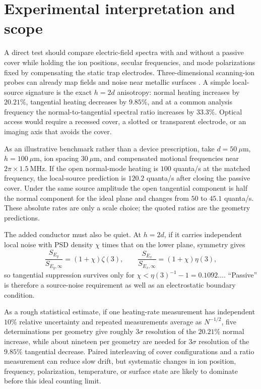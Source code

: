 \documentclass[aps,pra,twocolumn,superscriptaddress,longbibliography,nofootinbib,floatfix]{revtex4-2}
\theoremstyle{remark}
\begin{document}
\section{Experimental interpretation and scope}
\label{sec:experiment}

A direct test should compare electric-field spectra with and without a passive cover while holding the ion positions, secular frequencies, and mode polarizations fixed by compensating the static trap electrodes.  Three-dimensional scanning-ion probes can already map fields and noise near metallic surfaces \cite{Sagesser2024}.  A simple local-source signature is the exact $h=2d$ anisotropy: normal heating increases by $20.21\%$, tangential heating decreases by $9.85\%$, and at a common analysis frequency the normal-to-tangential spectral ratio increases by $33.3\%$.  Optical access would require a recessed cover, a slotted or transparent electrode, or an imaging axis that avoids the cover.

As an illustrative benchmark rather than a device prescription, take $d=50~\mu\mathrm m$, $h=100~\mu\mathrm m$, ion spacing $30~\mu\mathrm m$, and compensated motional frequencies near $2\pi\times1.5~\mathrm{MHz}$.  If the open normal-mode heating is $100$ quanta/s at the matched frequency, the local-source prediction is $120.2$ quanta/s after closing the passive cover.  Under the same source amplitude the open tangential component is half the normal component for the ideal plane and changes from $50$ to $45.1$ quanta/s.  These absolute rates are only a scale choice; the quoted ratios are the geometry predictions.

The added conductor must also be quiet.  At $h=2d$, if it carries independent local noise with PSD density $\chi$ times that on the lower plane, symmetry gives
\begin{equation}
\frac{S_{E_y}}{S_{E_y,\infty}}=(1+\chi)\zeta(3),\qquad
\frac{S_{E_x}}{S_{E_x,\infty}}=(1+\chi)\eta(3),
\end{equation}
so tangential suppression survives only for $\chi<\eta(3)^{-1}-1=0.1092\ldots$.  ``Passive'' is therefore a source-noise requirement as well as an electrostatic boundary condition.

As a rough statistical estimate, if one heating-rate measurement has independent $10\%$ relative uncertainty and repeated measurements average as $N^{-1/2}$, five determinations per geometry give roughly $3\sigma$ resolution of the $20.21\%$ normal increase, while about nineteen per geometry are needed for $3\sigma$ resolution of the $9.85\%$ tangential decrease.  Paired interleaving of cover configurations and a ratio measurement can reduce slow drift, but systematic changes in ion position, frequency, polarization, temperature, or surface state are likely to dominate before this ideal counting limit.
\end{document}
